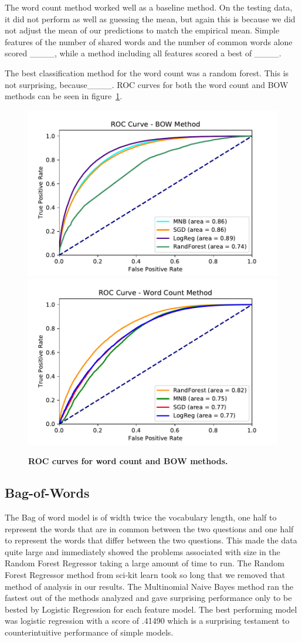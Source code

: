 \documentclass{article} %
\begin{document}
The word count method worked well as a baseline method. On the testing data, it did not perform as well as guessing the mean, but again this is because we did not adjust the mean of our predictions to match the empirical mean. Simple features of the number of shared words and the number of common words alone scored \_\_\_\_, while a method including all features scored a best of \_\_\_\_. 

The best classification method for the word count was a random forest. This is not surprising, because\_\_\_\_. ROC curves for both the word count and BOW methods can be seen in figure~\ref{fig:roc_wc}.

\begin{figure}[]
	\centering
	\includegraphics[width=.49\textwidth]{roc}
	\includegraphics[width=.49\textwidth]{roc_wc}
	\caption{\textbf{ROC curves for word count and BOW methods.}}
	\label{fig:roc_wc}
\end{figure}

\subsection{Bag-of-Words} \label{sub:bow_res}

The Bag of word model is of width twice the vocabulary length, one half to represent the words that are in common between the two questions and one half to represent the words that differ between the two questions. This made the data quite large and immediately showed the problems associated with size in the Random Forest Regressor taking a large amount of time to run. The Random Forest Regressor method from sci-kit learn took so long that we removed that method of analysis in our results. The Multinomial Naive Bayes method ran the fastest out of the methods analyzed and gave surprising performance only to be bested by Logistic Regression for each feature model. The best performing model was logistic regression with a score of .41490 which is a surprising testament to counterintuitive performance of simple models.
 
\end{document}
